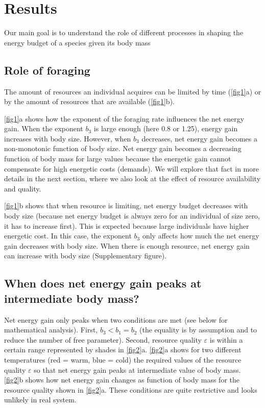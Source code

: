 \section*{Results}
Our main goal is to understand the role of different processes in shaping the energy budget of a species given its body mass
\subsection*{Role of foraging}
The amount of resources an individual acquires can be limited by time (\cref{fig1}a) or by the amount of resources that are available (\cref{fig1}b).

\cref{fig1}a shows how the exponent of the foraging rate influences the net energy gain.
When the exponent $b_3$ is large enough (here 0.8 or 1.25), energy gain increases with body size.
However, when $b_3$ decreases, net energy gain becomes a non-monotonic function of body size.
Net energy gain becomes a decreasing function of body mass for large values because the energetic gain cannot compensate for high energetic costs (demands).
We will explore that fact in more details in the next section, where we also look at the effect of resource availability and quality.     

\cref{fig1}b shows that when resource is limiting, net energy budget decreases with body size (because net energy budget is always zero for an individual of size zero, it has to increase first).
This is expected because large individuals have higher energetic cost.
In this case, the exponent $b_3$ only affects how much the net energy gain decreases with body size. 
When there is enough resource, net energy gain can increase with body size (Supplementary figure). 

\subsection*{When does net energy gain peaks at intermediate body mass?}
Net energy gain only peaks when two conditions  are met (see below for mathematical analysis).
First, $b_3 < b_1 = b_2$ (the equality is by assumption and to reduce the number of free parameter).
Second, resource quality $\varepsilon$ is within a certain range represented by shades in \cref{fig2}a.
\cref{fig2}a shows for two different temperatures (red = warm, blue = cold) the required values of the resource quality $\varepsilon$ so that net energy gain peaks at intermediate value of body mass.
\cref{fig2}b shows how net energy gain changes as function of body mass for the resource quality shown in \cref{fig2}a.
These conditions are quite restrictive and looks unlikely in real system.


